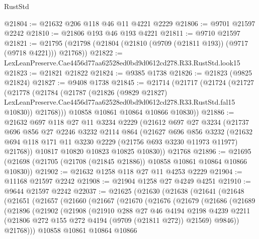 \begin{lexlean}{RustStd}
\begin{coremodule}
@21804 := @21632 @206 @118 @46 @11 @4221 @2229
@21806 := @9701 @21597 @2242
@21810 := @21806 @193 @46 @193 @4221
@21811 := @9710 @21597
@21821 := @21795 (@21798 (@21804 (@21810 (@9709 (@21811 @193)) (@9717 (@9718 @4221))) @21768))
@21822 := LexLeanPreserve.Cae4456d77aa62528ed0bd9d0612cd278.R33.RustStd.look15
@21823 := @21821 @21822
@21824 := @9385 @1738
@21826 := @21823 (@9825 @21824)
@21827 := @9408 @1738
@21845 := @21714
    (@21717
      (@21724
        (@21727
          (@21778
            (@21784
              (@21787
                (@21826
                  (@9829 @21827)
                  LexLeanPreserve.Cae4456d77aa62528ed0bd9d0612cd278.R33.RustStd.fal15
                  @10830))
              @21768)))
        @10858
        @10861
        @10864
        @10866
        @10830))
@21886 := @21632
    @697
    @118
    @27
    @11
    @3234
    @2229
    (@21612
      @697
      @27
      @3234
      (@21737
        @696
        @856
        @27
        @2246
        @3232
        @2114
        @864
        (@21627
          @696
          @856
          @3232
          (@21632 @694 @118 @171 @11 @3230 @2229 (@21756 @693 @3230 @11973 @11977) @21768))
        @10817
        @10820
        @10823
        @10825
        @10830))
    @21768
@21896 := @21695 (@21698 (@21705 (@21708 (@21845 @21886)) @10858 @10861 @10864 @10866 @10830))
@21902 := @21632 @1258 @118 @27 @11 @4253 @2229
@21904 := @11168 @21597 @2242
@21908 := @21904 @1258 @27 @4249 @4251
@21910 := @9644 @21597 @2242
@22037 := @21625
    (@21630
      (@21638
        (@21641
          (@21648
            (@21651
              (@21657
                (@21660
                  (@21667
                    (@21670
                      (@21676
                        (@21679
                          (@21686
                            (@21689
                              (@21896
                                (@21902
                                  (@21908
                                    (@21910
                                      @288
                                      @27
                                      @46
                                      @4194
                                      @2198
                                      @4239
                                      @2211
                                      (@21806 @272 @155 @272 @4194 (@9709 (@21811 @272)) @21569)
                                      @9846))
                                  @21768)))
                            @10858
                            @10861
                            @10864
                            @10866

\end{coremodule}
\end{lexlean}
